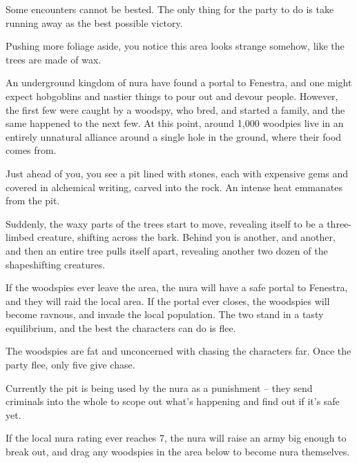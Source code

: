 \begin{multicols}{2}
Some encounters cannot be bested. The only thing for the party to do is take running away as the best possible victory.

\begin{boxtext}

	Pushing more foliage aside, you notice this area looks strange somehow, like the trees are made of wax.

\end{boxtext}

An underground kingdom of nura have found a portal to Fenestra, and one might expect hobgoblins and nastier things to pour out and devour people.  However, the first few were caught by a woodspy, who bred, and started a family, and the same happened to the next few.  At this point, around 1,000 woodpies live in an entirely unnatural alliance around a single hole in the ground, where their food comes from.

\begin{boxtext}

	Just ahead of you, you see a pit lined with stones, each with expensive gems and covered in alchemical writing, carved into the rock.
	An intense heat emmanates from the pit.

	Suddenly, the waxy parts of the trees start to move, revealing itself to be a three-limbed creature, shifting across the bark.  Behind you is another, and another, and then an entire tree pulls itself apart, revealing another two dozen of the shapeshifting creatures.

\end{boxtext}

If the woodspies ever leave the area, the nura will have a safe portal to Fenestra, and they will raid the local area.
If the portal ever closes, the woodspies will become ravnous, and invade the local population.
The two stand in a tasty equilibrium, and the best the characters can do is flee.

The woodspies are fat and unconcerned with chasing the characters far.  Once the party flee, only five give chase.


\woodspy

Currently the pit is being used by the nura as a punishment -- they send criminals into the whole to scope out what's happening and find out if it's safe yet.

If the local nura rating ever reaches 7, the nura will raise an army big enough to break out, and drag any woodspies in the area below to become nura themselves.


\end{multicols}
